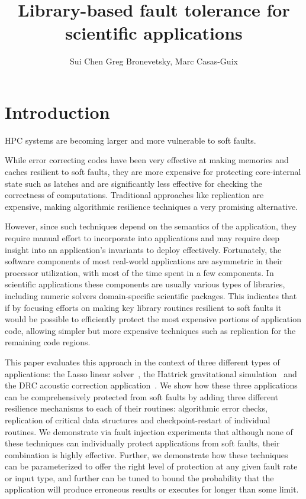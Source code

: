 \documentclass[prodmode,acmtecs]{acmconf} %
\title{Library-based fault tolerance for scientific applications}
\author{Sui Chen
Greg Bronevetsky, Marc Casas-Guix
}
\begin{document}
\maketitle

\section{Introduction}
\label{sec:intro}

HPC systems are becoming larger and more vulnerable to soft faults.

While error correcting codes have been very effective at making memories and caches resilient to soft faults, they are more expensive for protecting core-internal state such as latches and are significantly less effective for checking the correctness of computations.
Traditional approaches like replication are expensive, making algorithmic resilience techniques a very promising alternative.

However, since such techniques depend on the semantics of the application, they require manual effort to incorporate into applications and may require deep insight into an application's invariants to deploy effectively.
Fortunately, the software components of most real-world applications are asymmetric in their processor utilization, with most of the time spent in a few components.
In scientific applications these components are usually various types of libraries, including numeric solvers domain-specific scientific packages.
This indicates that if by focusing efforts on making key library routines resilient to soft faults it would be possible to efficiently protect the most expensive portions of application code, allowing simpler but more expensive techniques such as replication for the remaining code regions.

This paper evaluates this approach in the context of three different types of applications: the Lasso linear solver~\cite{}, the Hattrick gravitational simulation~\cite{} and the DRC acoustic correction application~\cite{}.
We show how these three applications can be comprehensively protected from soft faults by adding three different resilience mechanisms to each of their routines: algorithmic error checks, replication of critical data structures and checkpoint-restart of individual routines.
We demonstrate via fault injection experiments that although none of these techniques can individually protect applications from soft faults, their combination is highly effective.
Further, we demonstrate how these techniques can be parameterized to offer the right level of protection at any given fault rate or input type, and further can be tuned to bound the probability that the application will produce erroneous results or executes for longer than some limit.
\end{document}
